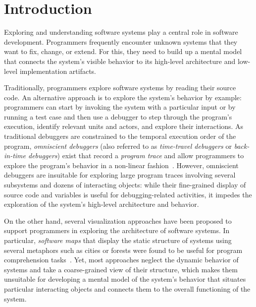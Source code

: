 \section{Introduction}
\label{sec:introduction}

Exploring and understanding software systems play a central role in software development.
Programmers frequently encounter unknown systems that they want to fix, change, or extend.
For this, they need to build up a mental model that connects the system's visible behavior to its high-level architecture and low-level implementation artifacts.

Traditionally, programmers explore software systems by reading their source code.
An alternative approach is to explore the system's behavior by example:
programmers can start by invoking the system with a particular input or by running a test case and then use a debugger to step through the program's execution, identify relevant units and actors, and explore their interactions.
As traditional debuggers are constrained to the temporal execution order of the program, \emph{omniscient debuggers} (also referred to as \emph{time-travel debuggers} or \emph{back-in-time debuggers}) exist that record a \emph{program trace} and allow programmers to explore the program's behavior in a non-linear fashion~\cite{lewis2003debugging,hofer2006design,pothier2009back,lienhard2008practical}.
However, omniscient debuggers are insuitable for exploring large program traces involving several subsystems and dozens of interacting objects:
while their fine-grained display of source code and variables is useful for debugging-related activities, it impedes the exploration of the system's high-level architecture and behavior.

On the other hand, several visualization approaches have been proposed to support programmers in exploring the architecture of software systems.
In particular, \emph{software maps} that display the static structure of systems using several metaphors such as cities or forests were found to be useful for program comprehension tasks~\cite{wettel2007visualizing,atzberger2021softwareforest,limberger2022visual}.
Yet, most approaches neglect the dynamic behavior of systems and take a coarse-grained view of their structure, which makes them unsuitable for developing a mental model of the system's behavior that situates particular interacting objects and connects them to the overall functioning of the system.

